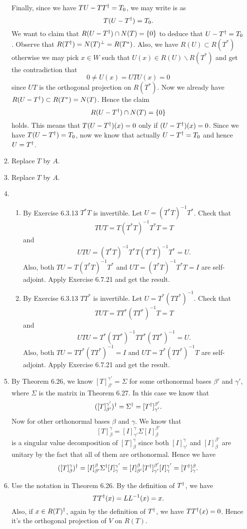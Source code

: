 \begin{enumerate}
Finally, since we have $TU-TT^{\dagger} =T_0$, we may write is as 
\[T(U-T^{\dagger} )=T_0.\]
We want to claim that $R(U-T^{\dagger})\cap N(T)=\{0\}$ to deduce that $U-T^{\dagger} =T_0$. Observe that $R(T^{\dagger})=N(T)^{\perp}=R(T^*)$. Also, we have $R(U)\subset R(T^*)$ otherwise we may pick $x\in W$ such that $U(x)\in R(U)\backslash R(T^*)$ and get the contradiction that 
\[0\neq U(x)=UTU(x)=0\]
since $UT$ is the orthogonal projection on $R(T^*)$. Now we already have $R(U-T^{\dagger})\subset R(T^*)=N(T)$. Hence the claim 
\[R(U-T^{\dagger})\cap N(T)=\{0\}\]
holds. This means that $T(U-T^{\dagger})(x)=0$ only if $(U-T^{\dagger})(x)=0$. Since we have $T(U-T^{\dagger})=T_0$, now we know that actually $U-T^{\dagger}=T_0$ and hence $U=T^{\dagger}$.
\item Replace $T$ by $A$.
\item Replace $T$ by $A$.
\item \begin{enumerate}
\item By Exercise 6.3.13 $T^*T$ is invertible. Let $U=(T^*T)^{-1}T^*$. Check that 
\[TU T=T(T^*T)^{-1}T^*T=T\]
and 
\[UTU=(T^*T)^{-1}T^*T(T^*T)^{-1}T^*=U.\]
Also, both $TU=T(T^*T)^{-1}T^*$ and $UT=(T^*T)^{-1}T^*T=I$ are self-adjoint. Apply Exercise 6.7.21 and get the result.
\item By Exercise 6.3.13 $TT^*$ is invertible. Let $U=T^*(TT^*)^{-1}$. Check that 
\[TUT=TT^*(TT^*)^{-1}T=T\]
and 
\[UTU=T^*(TT^*)^{-1}TT^*(TT^*)^{-1}=U.\]
Also, both $TU=TT^*(TT^*)^{-1}=I$ and $UT=T^*(TT^*)^{-1}T$ are self-adjoint. Apply Exercise 6.7.21 and get the result.
\end{enumerate}
\item By Theorem 6.26, we know $[T]_{\beta'}^{\gamma'}=\Sigma $ for some orthonormal bases $\beta'$ and $\gamma'$, where $\Sigma $ is the matrix in Theorem 6.27. In this case we know that 
\[([T]_{\beta'}^{\gamma'})^{\dagger}=\Sigma ^{\dagger} =[T^{\dagger}]_{\gamma'}^{\beta'}.\]
Now for other orthonormal bases $\beta $ and $\gamma$. We know that 
\[[T]_{\beta}^{\gamma}=[I]_{\gamma'}^{\gamma}\Sigma [I]_{\beta}^{\beta'}\]
is a singular value decomposition of $[T]_{\beta}^{\gamma}$ since both $[I]_{\gamma'}^{\gamma}$ and $[I]_{\beta}^{\beta'}$ are unitary by the fact that all of them are orthonormal. Hence we have 
\[([T]_{\beta}^{\gamma})^{\dagger} =[I]_{\beta'}^{\beta}\Sigma ^{\dagger} [I]_{\gamma}^{\gamma'}=[I]_{\beta'}^{\beta}[T^{\dagger}]_{\gamma'}^{\beta'}[I]_{\gamma}^{\gamma'}=[T^{\dagger}]_{\gamma}^{\beta}.\]
\item Use the notation in Theorem 6.26. By the definition of $T^{\dagger} $, we have 
\[TT^{\dagger} (x)=LL^{-1}(x)=x.\]
Also, if $x\in R(T)^{\dagger}$, again by the definition of $T^{\dagger} $, we have $TT^{\dagger}(x)=0$. Hence it's the orthogonal projection of $V$ on $R(T)$.
\end{enumerate}
